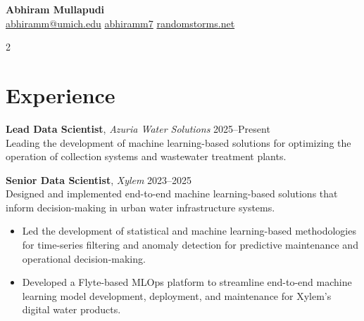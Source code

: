 \documentclass{article}
\newcommand{\experience}[4]{
  \textbf{#1}, \textit{#2} \hfill \textcolor{tuftegray}{#3}\\
  #4
}
\begin{document}
\setlength{\parindent}{0pt}

\LARGE\textbf{Abhiram Mullapudi}\\
\vspace{1em}
\footnotesize\faEnvelope\hspace{0.5em}\href{mailto:abhiramm@umich.edu}{\footnotesize abhiramm@umich.edu}\hspace{0.5em}
\footnotesize\faGithub\hspace{0.5em}\href{https://github.com/abhiramm7}{\footnotesize abhiramm7}\hspace{0.5em}
\footnotesize\faGlobe\hspace{0.5em}\href{https://randomstorms.net}{\footnotesize randomstorms.net}

\begin{paracol}{2}

\section{Experience}
\experience{Lead Data Scientist}{Azuria Water Solutions}{2025--Present}{
Leading the development of machine learning-based solutions for optimizing the operation of collection systems and wastewater treatment plants.
}
\vspace{0.5em}

\experience{Senior Data Scientist}{Xylem}{2023--2025}{
Designed and implemented end-to-end machine learning-based solutions that inform decision-making in urban water infrastructure systems.
\begin{itemize}[leftmargin=*,itemsep=1mm]
  \item Led the development of statistical and machine learning-based methodologies for time-series filtering and anomaly detection for predictive maintenance and operational decision-making.
  \item Developed a Flyte-based MLOps platform to streamline end-to-end machine learning model development, deployment, and maintenance for Xylem's digital water products.
\end{itemize}
}
\vspace{0.5em}


\end{paracol}
\end{document}
